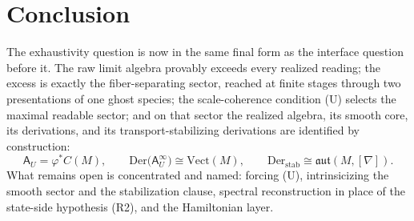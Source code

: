 \section{Conclusion}
\label{sec:dyn-conclusion}
The exhaustivity question is now in the same final form as the
interface question before it. The raw limit algebra provably exceeds
every realized reading; the excess is exactly the fiber-separating
sector, reached at finite stages through two presentations of one
ghost species; the scale-coherence condition \textup{(U)} selects the
maximal readable sector; and on that sector the realized algebra, its
smooth core, its derivations, and its transport-stabilizing
derivations are identified by construction:
\[
	\mathsf A_U=\varphi^*C(M),
	\qquad
	\mathrm{Der}\bigl(\mathsf A_U^\infty\bigr)\cong\mathrm{Vect}(M),
	\qquad
	\mathrm{Der}_{\mathrm{stab}}\cong\mathfrak{aut}(M,[\nabla]).
\]
What remains open is concentrated and named: forcing \textup{(U)},
intrinsicizing the smooth sector and the stabilization clause,
spectral reconstruction in place of the state-side hypothesis
\textup{(R2)}, and the Hamiltonian layer.

\begin{chapterclosing}
\end{chapterclosing}
